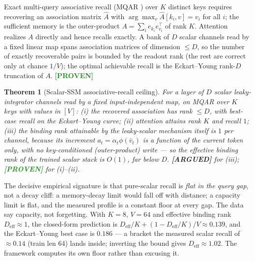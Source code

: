 \documentclass[11pt]{article}
\newtheorem{theorem}{Theorem}
\theoremstyle{definition}
\newcommand{\vbar}{\bar{v}}
\newcommand{\PROVEN}{\textcolor{ForestGreen}{\textbf{[PROVEN]}}}
\newcommand{\ARGUED}{\textcolor{BurntOrange}{\textbf{[ARGUED]}}}
\begin{document}
Exact multi-query associative recall (MQAR \cite{arora2024zoology}) over $K$ distinct keys
requires recovering an association matrix $\hat A$ with $\arg\max_v \hat A[k_i,v]=v_i$ for all
$i$; the sufficient memory is the outer-product $A=\sum_i e_{k_i}e_{v_i}^\top$ of rank $K$.
Attention realizes $A$ directly and hence recalls exactly. A bank of $D$ scalar channels read
by a fixed linear map spans association matrices of dimension $\le D$, so the number of exactly
recoverable pairs is bounded by the readout rank (the rest are correct only at chance $1/V$);
the optimal achievable recall is the Eckart--Young rank-$D$ truncation of $A$. \PROVEN

\begin{theorem}[Scalar-SSM associative-recall ceiling]
\label{thm:rank}
For a layer of $D$ scalar leaky-integrator channels read by a fixed input-independent map, on
MQAR over $K$ keys with values in $[V]$: (i) the recovered association has rank $\le D$, with
best-case recall on the Eckart--Young curve; (ii) attention attains rank $K$ and recall $1$;
(iii) the \emph{binding} rank attainable by the leaky-scalar mechanism itself is $1$ per
channel, because its increment $a_t=\alpha_t\phi(\vbar_t)$ is a function of the current token
only, with no key-conditioned (outer-product) write --- so the effective binding rank of the
trained scalar stack is $O(1)$, far below $D$. \ARGUED{} for (iii); \PROVEN{} for (i)--(ii).
\end{theorem}

The decisive empirical signature is that pure-scalar recall is \emph{flat in the query gap}, not
a decay cliff: a memory-decay limit would fall off with distance; a capacity limit is flat, and
the measured profile is a constant floor at every gap. The data say capacity, not forgetting.
With $K{=}8$, $V{=}64$ and effective binding rank $D_\text{eff}{\approx}1$, the closed-form
prediction is $D_\text{eff}/K+(1-D_\text{eff}/K)/V\approx0.139$, and the Eckart--Young best case
is $0.186$ --- a bracket the measured scalar recall of $\approx0.14$ (train len 64) lands
inside; inverting the bound gives $D_\text{eff}\approx1.02$. The framework computes its own
floor rather than excusing it.
\end{document}
